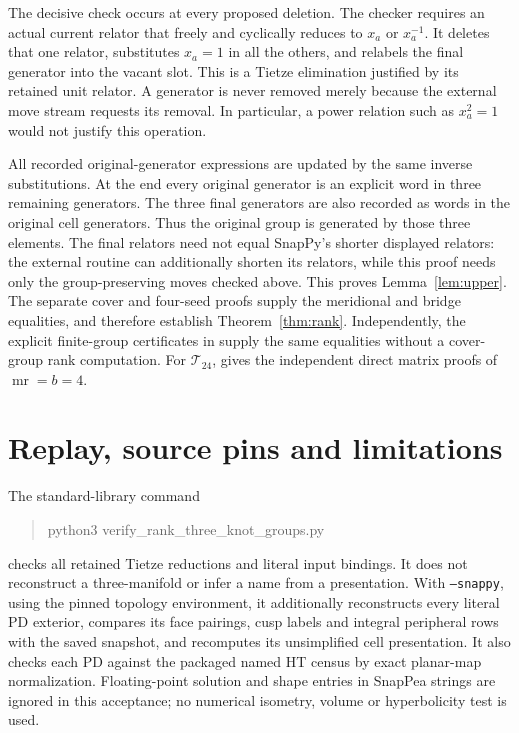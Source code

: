 \documentclass[11pt]{article}
\begin{document}
The decisive check occurs at every proposed deletion. The checker
requires an actual current relator that freely and cyclically reduces
to $x_a$ or $x_a^{-1}$. It deletes that one relator, substitutes
$x_a=1$ in all the others, and relabels the final generator into
the vacant slot. This is a Tietze elimination justified by its
retained unit relator. A generator is never removed merely because
the external move stream requests its removal. In particular,
a power relation such as $x_a^2=1$ would not justify this operation.

All recorded original-generator expressions are updated by the same
inverse substitutions. At the end every original generator is an
explicit word in three remaining generators. The three final
generators are also recorded as words in the original cell generators.
Thus the original group is generated by those three elements.
The final relators need not equal SnapPy's shorter displayed relators:
the external routine can additionally shorten its relators, while
this proof needs only the group-preserving moves checked above.
This proves Lemma~\ref{lem:upper}.
The separate cover and four-seed proofs supply the meridional and
bridge equalities, and therefore establish Theorem~\ref{thm:rank}. Independently,
the explicit finite-group certificates in
 supply the same equalities
without a cover-group rank computation. For $\mathcal T_{24}$,
 gives the independent direct matrix
proofs of $\operatorname{mr}=b=4$.

\section{Replay, source pins and limitations}

The standard-library command
\begin{quote}\ttfamily
python3 verify\_rank\_three\_knot\_groups.py
\end{quote}
checks all retained Tietze reductions and literal input bindings.
It does not reconstruct a three-manifold or infer a name from a
presentation. With \texttt{--snappy}, using the pinned topology
environment, it additionally reconstructs every literal PD exterior,
compares its face pairings, cusp labels and integral peripheral
rows with the saved snapshot, and recomputes its unsimplified cell
presentation. It also checks each PD against the packaged named
HT census by exact planar-map normalization. Floating-point solution
and shape entries in SnapPea strings are ignored in this acceptance;
no numerical isometry, volume or hyperbolicity test is used.
\end{document}
